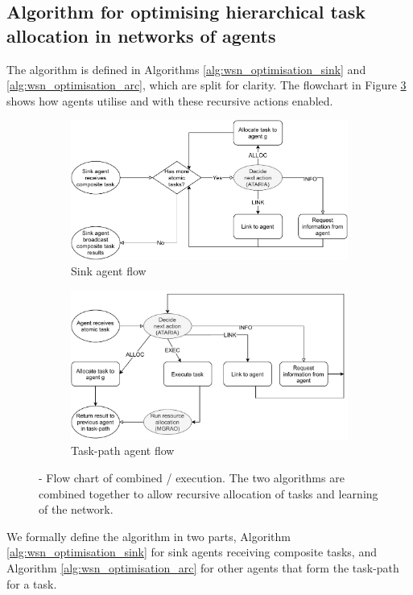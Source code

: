 \newcommand{\functionANHTAO}[2]{
	\functionSignature{\texttt{anhtao-path}}{\varAtomicTask{}{}, \varAgent{}{}}
}

\subsection{Algorithm for optimising hierarchical task allocation in networks of agents}

The \acronymWSNOptimisationExtended{}{} algorithm is defined in Algorithms \ref{alg:wsn_optimisation_sink}
and \ref{alg:wsn_optimisation_arc}, which are split for clarity. The flowchart in Figure \ref{fig:algorithm-flow} shows how agents utilise \acronymATARIA{}{} and \acronymMGRAO{}{} with these recursive actions enabled. 
\begin{figure}[ht]
	\centering
	\begin{subfigure}{.49\textwidth}
		\centering
		\includegraphics[width=0.9\linewidth, trim={25pt 0pt 25pt 0pt, clip}]{algorithm-flow-sink}
		\caption{Sink agent flow}
		\label{fig:algorithm-flow-sink}
	\end{subfigure} \hfill%
	\begin{subfigure}{.49\textwidth}
		\centering	\includegraphics[width=0.9\linewidth,trim={25pt 0pt 25pt 0pt, clip}]{algorithm-flow-arc}
		\caption{Task-path agent flow}
		\label{fig:algorithm-flow-arc}
	\end{subfigure}
	\caption{\textbf{\acronymWSNOptimisation{}{}} - Flow chart of combined \acronymATARIA{}{}/\acronymMGRAO{}{} execution. The two algorithms are combined together to allow recursive allocation of tasks and learning of the network.}
	\label{fig:algorithm-flow}
\end{figure}
We formally define the \acronymWSNOptimisation{}{} algorithm in two parts, Algorithm \ref{alg:wsn_optimisation_sink} for sink agents receiving composite tasks, and Algorithm \ref{alg:wsn_optimisation_arc} for other agents that form the task-path for a task.


